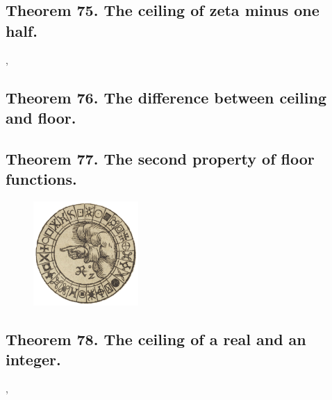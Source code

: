 \documentclass[preview]{standalone}
\begin{document}
\subsection[The ceiling of zeta minus one half.]
    {
        \color{section}Theorem 75. \color{black} The ceiling of zeta minus one half.
    }

\vspace{.25\baselineskip}
\sep
\pagebreak


\subsection[The difference between a ceiling and a floor.]
    {
        \color{section}Theorem 76. \color{black} The difference between ceiling and floor.
    }

\pagebreak


\subsection[The second property of floor functions.]
    {
        \color{section}Theorem 77. \color{black} The second property of floor functions.
    }

\begin{figure}[!h]
    \centering
    \includegraphics[width=4cm]{../resources/jpg/2.3.functions/symbol2.jpg}
\end{figure}
\pagebreak


\subsection[The ceiling of a real number and an integer.]
    {
        \color{section}Theorem 78. \color{black} The ceiling of a real and an integer.
    }

\sep
\end{document}
